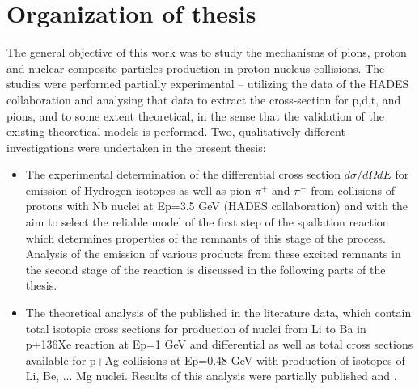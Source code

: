 	\section{Organization of thesis}
	The general objective of this work was to study the mechanisms of pions, proton and nuclear composite particles production in proton-nucleus collisions. The studies were performed partially experimental – utilizing the data of the HADES collaboration and analysing that data to extract the cross-section for p,d,t, and pions, and to some extent theoretical, in the sense that the validation of the existing theoretical models is performed. 
	Two, qualitatively different investigations were undertaken in the present thesis:
	\begin{itemize}
	
	\item The experimental determination of the differential cross section $d\sigma/d\Omega dE$ for emission of Hydrogen isotopes as well as pion $\pi^{+}$ and $\pi^{-} $ from collisions of protons with Nb nuclei at Ep=3.5 GeV (HADES collaboration) and with the aim to select the reliable model of the first step of the spallation reaction which determines properties of the remnants of this stage of the process. Analysis of the emission of  various products from these excited remnants  in the second stage of the reaction is discussed in the following parts of the thesis. 
	\item The theoretical analysis of the published in the literature data, which contain total isotopic cross sections for production of nuclei from Li to Ba in p+136Xe reaction at
	Ep=1 GeV and differential as well as total cross sections available for p+Ag collisions at Ep=0.48 GeV with production of isotopes of Li, Be, ... Mg nuclei. Results of this analysis were partially published \cite{singh2018predictive} and \cite{singh2019odd}.
\end{itemize}